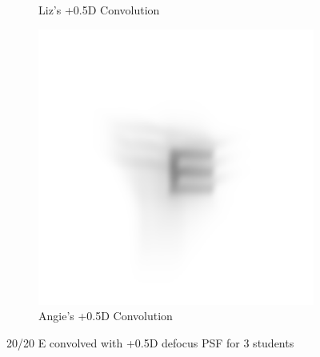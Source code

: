 \documentclass{article}
\begin{document}
\begin{figure}[H]
\begin{subfigure}{.3\textwidth}
  \caption{Liz's +0.5D Convolution}
  \label{fig:liz05d}
\end{subfigure}
\begin{subfigure}{.3\textwidth}
  \centering
  \includegraphics[width=1\linewidth]{Angie_R_0526_1_500_zer_05_5_PSF_convE.png}
  \caption{Angie's +0.5D Convolution}
  \label{fig:angie05d}
\end{subfigure}

\caption{20/20 E convolved with +0.5D defocus PSF for 3 students}
\label{fig:Defocus_05D}
\end{figure}

\clearpage
\end{document}
